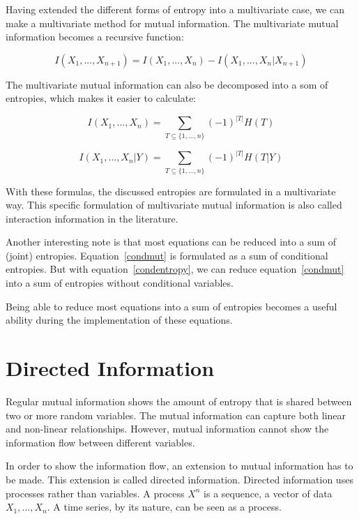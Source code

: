 Having extended the different forms of entropy into a multivariate case, we can make a multivariate method for mutual information. The multivariate mutual information becomes a recursive function:

\begin{equation}
I(X_1, ..., X_{n+1}) = I(X_1, ..., X_n) - I(X_1, ..., X_n | X_{n+1})
\end{equation}

The multivariate mutual information can also be decomposed into a som of entropies, which makes it easier to calculate:

\begin{equation}\label{mut}
I(X_1, ..., X_n) = \sum_{T \subseteq \{1,...,n\}} (-1)^{|T|}H(T)
\end{equation}

\begin{equation}\label{condmut}
I(X_1, ..., X_n | Y) = \sum_{T \subseteq \{1,...,n\}} (-1)^{|T|}H(T|Y)
\end{equation}
    
With these formulas, the discussed entropies are formulated in a multivariate way. This specific formulation of multivariate mutual information is also called interaction information in the literature.

Another interesting note is that most equations can be reduced into a sum of (joint) entropies. Equation~\ref{condmut} is formulated as a sum of conditional entropies. But with equation~\ref{condentropy}, we can reduce equation~\ref{condmut} into a sum of entropies without conditional variables. 

Being able to reduce most equations into a sum of entropies becomes a useful ability during the implementation of these equations.

\section{Directed Information}\label{directed-information}

Regular mutual information shows the amount of entropy that is shared between two or more random variables. The mutual information can capture both linear and non-linear relationships. However, mutual information cannot show the information flow between different variables. 

In order to show the information flow, an extension to mutual information has to be made. This extension is called directed information. Directed information uses processes rather than variables. A process $X^n$ is a sequence, a vector of data $X_1,...,X_n$. A time series, by its nature, can be seen as a process.

